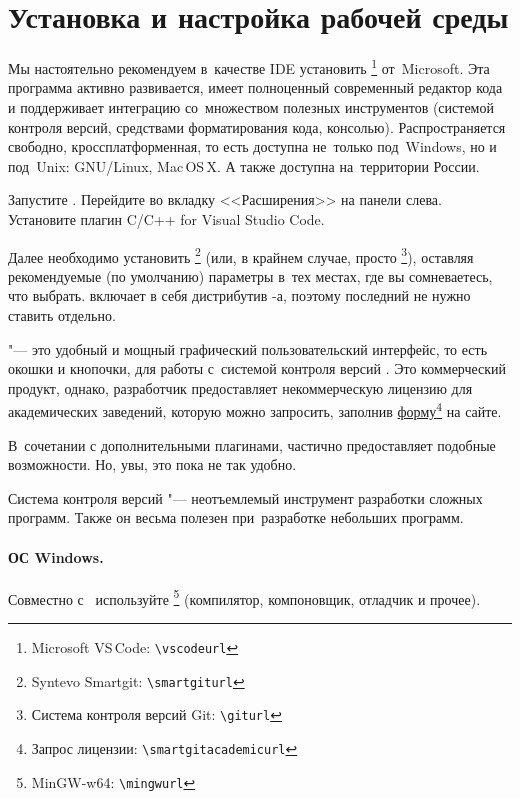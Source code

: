\section{Установка и настройка рабочей среды}\label{sect:workEnv}
Мы настоятельно рекомендуем в~качестве IDE установить \href{\vscodeurl}{}\footnote{\textenglish{Microsoft VS\,Code:} \nolinkurl{\vscodeurl}} от~Microsoft. Эта программа активно развивается, имеет полноценный современный редактор кода и поддерживает интеграцию со~множеством полезных инструментов (системой контроля версий, средствами форматирования кода, консолью). Распространяется свободно, кроссплатформенная, то есть доступна не~только под~Windows, но и под~Unix: GNU/Linux, Mac\,OS\,X. А также доступна на~территории России.

Запустите . Перейдите во вкладку <<Расширения>> на панели слева. Установите плагин \textenglish{C/C++ for Visual Studio Code}.

Далее необходимо установить \href{\smartgiturl}{}\footnote{Syntevo Smartgit: \nolinkurl{\smartgiturl}} (или, в крайнем случае, просто \href{\giturl}{\git}\footnote{Система контроля версий Git: \nolinkurl{\giturl}}), оставляя рекомендуемые (по умолчанию) параметры в~тех местах, где вы сомневаетесь, что выбрать.  включает в себя дистрибутив \git-а, поэтому последний не нужно ставить отдельно.

 "--- это удобный и мощный графический пользовательский интерфейс, то есть окошки и кнопочки, для работы с~системой контроля версий \git. Это коммерческий продукт, однако, разработчик предоставляет некоммерческую лицензию для академических заведений, которую можно запросить, заполнив \href{\smartgitacademicurl}{форму}\footnote{Запрос лицензии: \nolinkurl{\smartgitacademicurl}} на сайте.

В~сочетании с дополнительными плагинами,  частично предоставляет подобные возможности. Но, увы, это пока не так удобно.

Система контроля версий "--- неотъемлемый инструмент разработки сложных программ. Также он весьма полезен при~разработке небольших программ.



\paragraph{ОС Windows.}\label{sect:winSetup}
Совместно с~ используйте \href{\mingwurl}{}\footnote{MinGW-w64: \nolinkurl{\mingwurl}} (компилятор, компоновщик, отладчик и прочее).

